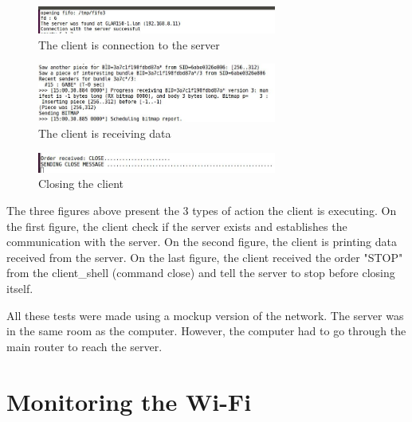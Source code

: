 \begin{figure}[H]
\begin{center}
\includegraphics[width=0.7\textwidth]{image/clientinit.jpg}%
\caption{The client is connection to the server}%
\label{figure:clientint}%
\end{center}

\end{figure}\begin{figure}[H]
\begin{center}
\includegraphics[width=0.7\textwidth]{image/clientcomm.jpg}%
\caption{The client is receiving data}%
\label{figure:clientcomm}%
\end{center}

\end{figure}\begin{figure}[H]
\begin{center}
\includegraphics[width=0.7\textwidth]{image/closeclient.jpg}%
\caption{Closing the client}%
\label{figure:closeclient}%
\end{center}
\end{figure}

The three figures above present the 3 types of action the client is executing. On the first figure, the client check if the server exists and establishes the communication with the server. On the second figure, the client is printing data received from the server. On the last figure, the client received the order "STOP" from the client\_shell (command close) and tell the server to stop before closing itself.

All these tests were made using a mockup version of the network. The server was in the same room as the computer. However, the computer had to go through the main router to reach the server. 




\section{Monitoring the Wi-Fi}


